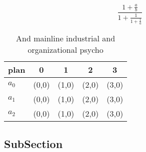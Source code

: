 \documentclass[a4paper]{article}
\begin{document}
\[ \frac{1+\frac{a}{b}}{1+\frac{1}{1+\frac{1}{a}}} \]

\begin{table}
\begin{adjustbox}{width=0.6\columnwidth}
\begin{tabular}{|l|l|l|l|l|}
\hline
\textbf{plan} & \multicolumn{1}{c|}{\textbf{0}} & \multicolumn{1}{c|}{\textbf{1}} & \multicolumn{1}{c|}{\textbf{2}} & \multicolumn{1}{c|}{\textbf{3}} \\ \hline
\textbf{$a_0$}  & (0,0) & (1,0) & (2,0) & (3,0) \\ \hline
\textbf{$a_1$}  & (0,0) & (1,0) & (2,0) & (3,0) \\ \hline
\textbf{$a_2$}  & (0,0) & (1,0) & (2,0) & (3,0) \\ \hline
\end{tabular}
\end{adjustbox}
\caption{And mainline industrial and organizational psycho
}
\end{table}

\subsection{SubSection}
\end{document}
